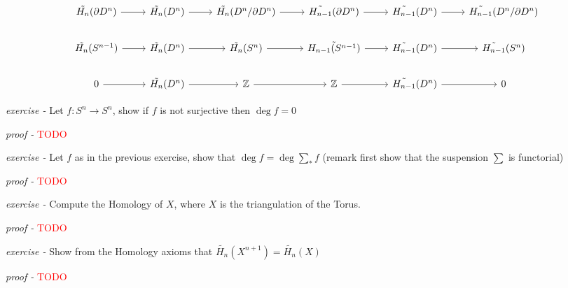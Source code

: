 \documentclass[11pt]{article}
\theoremstyle{definition}
\begin{document}
    \begin{equation*}
        \begin{tikzcd}
            \tilde{H_n}(\partial D^n) \arrow[r] & \tilde{H_n}(D^n) \arrow[r] & \tilde{H_n}(D^n/\partial D^n) \arrow[r] & \tilde{H_{n-1}}(\partial D^n) \arrow[r] & \tilde{H_{n-1}}(D^n) \arrow[r] & \tilde{H_{n-1}}(D^n/\partial D^n) \\
            \tilde{H_n}(S^{n-1}) \arrow[r] & \tilde{H_n}(D^n) \arrow[r] & \tilde{H_n}(S^n) \arrow[r] & \tilde{H_{n-1}(S^{n-1})} \arrow[r] &\tilde{H_{n-1}}(D^n) \arrow[r] & \tilde{H_{n-1}}(S^n)\\
            0 \arrow[r] & \tilde{H_n}(D^n) \arrow[r] & \mathbb{Z} \arrow[r] & \mathbb{Z} \arrow[r] &\tilde{H_{n-1}}(D^n) \arrow[r] & 0
        \end{tikzcd}
    \end{equation*}


    \emph{exercise - }\label{HEx11} Let \(f: S^n \to S^n\), show if \(f\) is not surjective then \(\deg f = 0\)

    \emph{proof - }\textcolor{red}{TODO}


    \emph{exercise - }\label{HEx12} Let \(f\) as in the previous exercise, show that \(\deg f = \deg \sum_* f \) (remark first  show that the suspension \(\sum\) is functorial)

    \emph{proof - }\textcolor{red}{TODO}



    \emph{exercise - }\label{HEx13} Compute the Homology of \(X\), where \(X\) is the triangulation of the Torus.

    \emph{proof - }\textcolor{red}{TODO}


    \emph{exercise - }\label{HEx14} Show from the Homology axioms that \(\tilde{H_n}(X^{n+1}) = \tilde{H_n}(X)\)

    \emph{proof - }\textcolor{red}{TODO}
\end{document}
